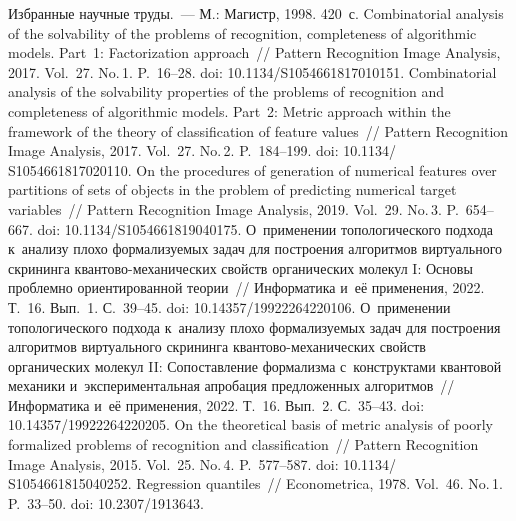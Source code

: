 \begin{multicols}{2}
{\small\frenchspacing
 {%
 \begin{thebibliography}{9}
   Избранные научные труды.~--- М.: Магистр, 1998. 420~с. 
   Combinatorial analysis of the solvability of the problems of 
recognition, completeness of algorithmic models. Part~1: Factorization approach~// Pattern 
Recognition Image Analysis, 2017. Vol.~27. No.\,1. P.~16--28. doi: 10.1134/S1054661817010151.
   Combinatorial analysis of the solvability properties of the 
problems of recognition and completeness of algorithmic models. Part~2: Metric approach within 
the framework of the theory of classification of feature values~// Pattern Recognition Image Analysis, 
2017. Vol.~27. No.\,2. P.~184--199.  doi: 10.1134/ S1054661817020110.
   On the procedures of generation of numerical features over 
partitions of sets of objects in the problem of predicting numerical target variables~// Pattern 
Recognition Image Analysis, 2019. Vol.~29. No.\,3. P.~654--667. doi: 10.1134/S1054661819040175.
   О~применении топологического подхода к~анализу плохо 
формализуемых задач для построения алгоритмов виртуального скрининга  
кван\-то\-во-ме\-ха\-ни\-че\-ских свойств органических молекул I: Основы проблемно 
ориентированной теории~// Информатика и~её применения, 2022. Т.~16. Вып.~1. С.~39--45. 
doi: 10.14357/19922264220106.
   О~применении топологического подхода к~анализу плохо 
формализуемых задач для построения алгоритмов виртуального скрининга  
кван\-то\-во-ме\-ха\-ни\-че\-ских свойств органических молекул II: Со\-по\-став\-ле\-ние 
формализма с~конструктами квантовой механики и~экспериментальная апробация 
предложенных алгоритмов~// Информатика и~её применения, 2022. Т.~16. Вып.~2. С.~35--43. 
doi: 10.14357/19922264220205. 
   On the theoretical basis of metric analysis of poorly 
formalized problems of recognition and classification~// Pattern Recognition Image Analysis, 2015. 
Vol.~25. No.\,4. P.~577--587.  doi: 10.1134/ S1054661815040252.
   Regression quantiles~// Econometrica, 1978. Vol.~46. No.\,1. 
P.~33--50. doi: 10.2307/1913643.
\end{thebibliography}

 }
 }

\end{multicols}

